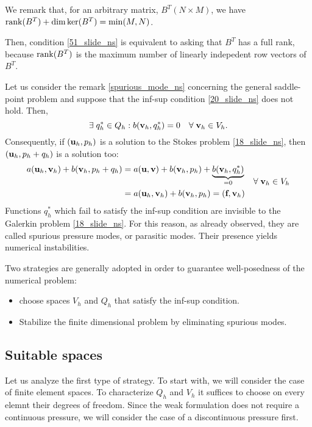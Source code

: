 \begin{remark}
    We remark that, for an arbitrary matrix, \(B^T (N\times M)\), we have \(\rank(B^T) + \dim \ker (B^T) = \min(M,N)\). 
    
    Then, condition \eqref{51_slide_ns} is equivalent to asking that \(B^T\) has a full rank, because \(\rank(B^T)\) is the maximum number of linearly indepedent row vectors of \(B^T\).
\end{remark}
Let us consider the remark \eqref{spurious_mode_ns}  concerning the general saddle-point problem and suppose that the inf-sup condition \eqref{20_slide_ns} does not hold. Then, 
\begin{equation}
    \exists \; q_h^* \in Q_h : b(\textbf{v}_h, q^*_h) = 0 \quad \forall \; \textbf{v}_h \in V_h.
    \label{52_slide_ns}
\end{equation}
Consequently, if \((\textbf{u}_h, p_h)\) is a solution to the Stokes problem \eqref{18_slide_ns}, then \((\textbf{u}_h, p_h+q_h)\) is a solution too:
\begin{equation*}
    \begin{aligned}
        a(\textbf{u}_h, \textbf{v}_h) + b(\textbf{v}_h, p_h+q_h) &= a(\textbf{u},\textbf{v}) + b(\textbf{v}_h, p_h) + \underbrace{b(\textbf{v}_h, q^*_h)}_{=0} \\ 
        &= a(\textbf{u}_h, \textbf{v}_h) + b(\textbf{v}_h, p_h) = (\textbf{f}, \textbf{v}_h)
    \end{aligned}
    \quad \forall \; \textbf{v}_h \in V_h
\end{equation*}
Functions \(q_h^*\) which fail to satisfy the inf-sup condition are invisible to the Galerkin problem \eqref{18_slide_ns}. For this reason, as already observed, they are called spurious pressure modes, or parasitic modes. Their presence yields numerical instabilities. 

Two strategies are generally adopted in order to guarantee well-posedness of the numerical problem:
\begin{itemize}
    \item choose spaces \(V_h\) and \(Q_h\) that satisfy the inf-sup condition. 
    \item Stabilize the finite dimensional problem by eliminating spurious modes.
\end{itemize}
\subsection{Suitable spaces}
Let us analyze the first type of strategy. To start with, we will consider the case of finite element spaces. To characterize \(Q_h\) and \(V_h\) it suffices to choose on every elemnt their degrees of freedom. Since the weak formulation does not require a continuous pressure, we will consider the case of a discontinuous pressure first. 

